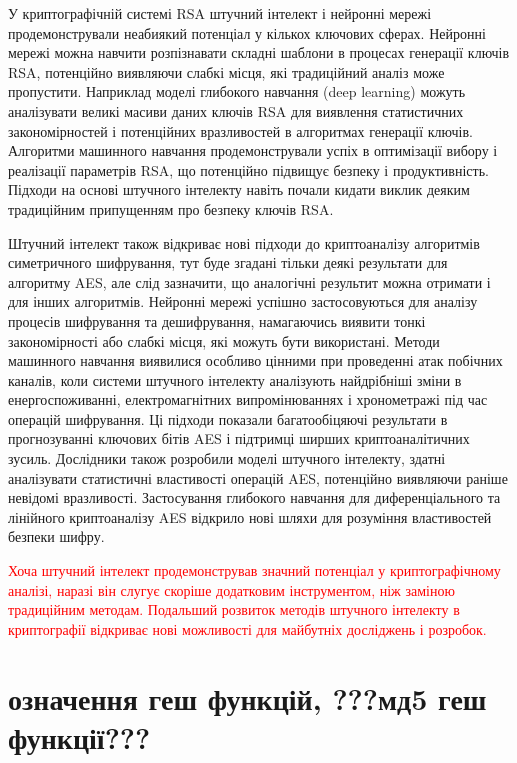 У криптографічній системі RSA штучний інтелект і нейронні мережі продемонстрували неабиякий потенціал у кількох ключових сферах. Нейронні мережі можна навчити розпізнавати складні шаблони в процесах генерації ключів RSA, потенційно виявляючи слабкі місця, які традиційний аналіз може пропустити. Наприклад моделі глибокого навчання (deep learning) можуть аналізувати великі масиви даних ключів RSA для виявлення статистичних закономірностей і потенційних вразливостей в алгоритмах генерації ключів. Алгоритми машинного навчання продемонстрували успіх в оптимізації вибору і реалізації параметрів RSA, що потенційно підвищує безпеку і продуктивність. Підходи на основі штучного інтелекту навіть почали кидати виклик деяким традиційним припущенням про безпеку ключів RSA.

Штучний інтелект також відкриває нові підходи до криптоаналізу алгоритмів симетричного шифрування, тут буде згадані тільки деякі результати для алгоритму AES, але слід зазначити, що аналогічні результит можна отримати і для інших алгоритмів. Нейронні мережі успішно застосовуються для аналізу процесів шифрування та дешифрування, намагаючись виявити тонкі закономірності або слабкі місця, які можуть бути використані. Методи машинного навчання виявилися особливо цінними при проведенні атак побічних каналів, коли системи штучного інтелекту аналізують найдрібніші зміни в енергоспоживанні, електромагнітних випромінюваннях і хронометражі під час операцій шифрування. Ці підходи показали багатообіцяючі результати в прогнозуванні ключових бітів AES і підтримці ширших криптоаналітичних зусиль. Дослідники також розробили моделі штучного інтелекту, здатні аналізувати статистичні властивості операцій AES, потенційно виявляючи раніше невідомі вразливості. Застосування глибокого навчання для диференціального та лінійного криптоаналізу AES відкрило нові шляхи для розуміння властивостей безпеки шифру.

\textcolor{red}{Хоча штучний інтелект продемонстрував значний потенціал у криптографічному аналізі, наразі він слугує скоріше додатковим інструментом, ніж заміною традиційним методам. Подальший розвиток методів штучного інтелекту в криптографії відкриває нові можливості для майбутніх досліджень і розробок.
}

\section{означення геш функцій, ???мд5 геш функції???}

